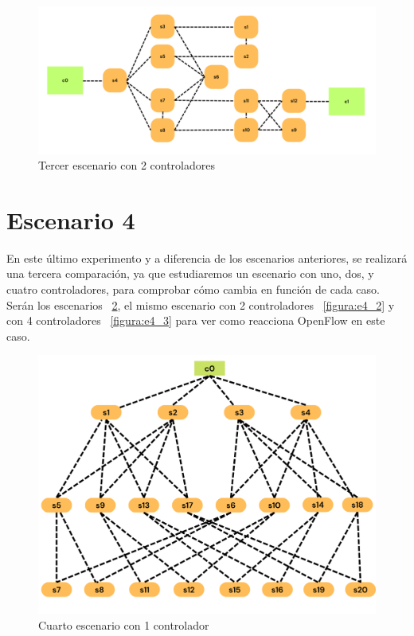 \documentclass[a4paper, 12pt]{book}
\begin{document}
 	\begin{figure}[H]
 		\centering
 		\includegraphics[width=16cm, keepaspectratio]{img/b4_2}
 		\caption{Tercer escenario con 2 controladores}
 		\label{figura:b4_2}
 	\end{figure}
	
	
	\section{Escenario 4}
	
	En este último experimento y a diferencia de los escenarios anteriores, se realizará una tercera comparación, ya que estudiaremos un escenario con uno, dos, y cuatro controladores, para comprobar cómo cambia en función de cada caso.
	Serán los escenarios ~\ref{figura:e4_1}, el mismo escenario con 2 controladores ~\ref{figura:e4_2} y con 4 controladores ~\ref{figura:e4_3} para ver como reacciona OpenFlow en este caso.
	
	\begin{figure}[H]
		\centering
		\includegraphics[width=16cm, keepaspectratio]{img/e4_1}
		\caption{Cuarto escenario con 1 controlador}
		\label{figura:e4_1}
	\end{figure}
	
\end{document}
